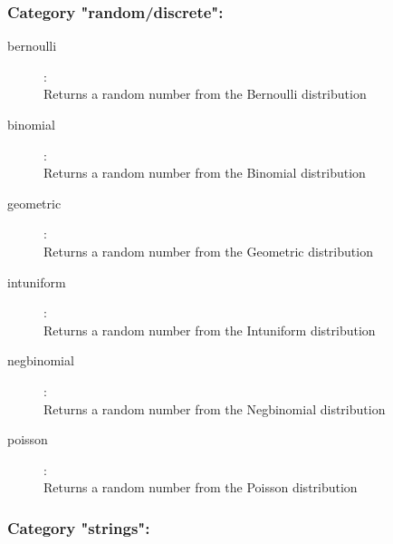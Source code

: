 \subsubsection{Category "random/discrete":}
\label{sec:ned-functions:category-random-discrete}

\begin{description}
\item[bernoulli]:  \\
    Returns a random number from the Bernoulli distribution
\item[binomial]:  \\
    Returns a random number from the Binomial distribution
\item[geometric]:  \\
    Returns a random number from the Geometric distribution
\item[intuniform]:  \\
    Returns a random number from the Intuniform distribution
\item[negbinomial]:  \\
    Returns a random number from the Negbinomial distribution
\item[poisson]:  \\
    Returns a random number from the Poisson distribution

\end{description}

\subsubsection{Category "strings":}
\label{sec:ned-functions:category-strings}

